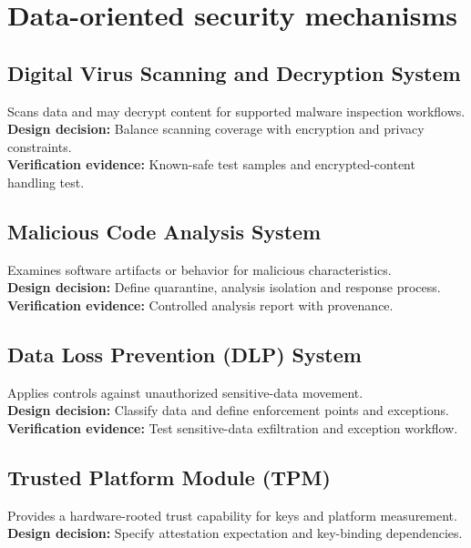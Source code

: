 \documentclass[10pt,letterpaper]{article}
\begin{document}
\section{Data-oriented security mechanisms}
\subsection{Digital Virus Scanning and Decryption System}
Scans data and may decrypt content for supported malware inspection workflows.\\[4pt]
\textbf{Design decision:} Balance scanning coverage with encryption and privacy constraints.\\[3pt]
\textbf{Verification evidence:} Known-safe test samples and encrypted-content handling test.\\[3pt]
\subsection{Malicious Code Analysis System}
Examines software artifacts or behavior for malicious characteristics.\\[4pt]
\textbf{Design decision:} Define quarantine, analysis isolation and response process.\\[3pt]
\textbf{Verification evidence:} Controlled analysis report with provenance.\\[3pt]
\subsection{Data Loss Prevention (DLP) System}
Applies controls against unauthorized sensitive-data movement.\\[4pt]
\textbf{Design decision:} Classify data and define enforcement points and exceptions.\\[3pt]
\textbf{Verification evidence:} Test sensitive-data exfiltration and exception workflow.\\[3pt]
\subsection{Trusted Platform Module (TPM)}
Provides a hardware-rooted trust capability for keys and platform measurement.\\[4pt]
\textbf{Design decision:} Specify attestation expectation and key-binding dependencies.\\[3pt]
\end{document}
